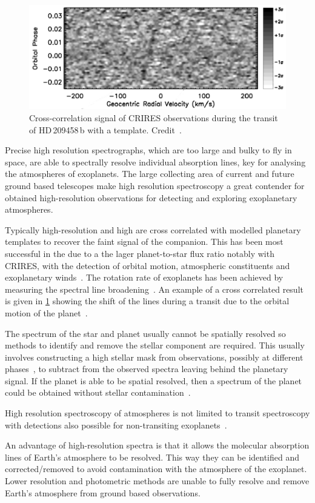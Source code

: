 \begin{figure}
    \centering
    \includegraphics[width=0.7\linewidth]{figures/introduction/snellen2010}
    \caption{Cross-correlation signal of {CRIRES} observations during the transit of HD\,209458\,b with a  template.
Credit~\citet{snellen_orbital_2010}.}
    \label{fig:snellen2010}
\end{figure}

Precise high resolution spectrographs, which are too large and bulky to fly in space, are able to spectrally resolve individual absorption lines, key for analysing the atmospheres of exoplanets.
The large collecting area of current and future ground based telescopes make high resolution spectroscopy a great contender for obtained high-resolution observations for detecting and exploring exoplanetary atmospheres.

Typically high-resolution and high \snr{} are cross correlated with modelled planetary templates to recover the faint signal of the companion.
This has been most successful in the \nir{} due to a the lager planet-to-star flux ratio
notably with CRIRES, with the detection of orbital motion, atmospheric constituents and exoplanetary winds~\citep[e.g.][]{snellen_orbital_2010, dekok_detection_2013, brogi_carbon_2014, brogi_rotation_2016, schwarz_evidence_2015}.
The rotation rate of exoplanets has been achieved by measuring the spectral line broadening~\citep{snellen_fast_2014, brogi_rotation_2016}.
An example of a cross correlated result is given in \cref{fig:snellen2010} showing the shift of the  lines during a transit due to the orbital motion of the planet~\citep{snellen_orbital_2010}.

The spectrum of the star and planet usually cannot be spatially resolved so methods to identify and remove the stellar component are required.
This usually involves constructing a high \snr{} stellar mask from observations, possibly at different phases~\citep[e.g.][]{rodler_weighing_2012}, to subtract from the observed spectra leaving behind the planetary signal.
If the planet is able to be spatial resolved, then a spectrum of the planet could be obtained without stellar contamination~\citep[e.g.][]{snellen_combining_2015}.

High resolution spectroscopy of atmospheres is not limited to transit spectroscopy with detections also possible for non-transiting exoplanets~\citep[e.g.][]{brogi_signature_2012, brogi_carbon_2014,lockwood_nearir_2014, piskorz_evidence_2016}.

An advantage of high-resolution spectra is that it allows the molecular absorption lines of Earth's atmosphere to be resolved.
This way they can be identified and corrected/removed to avoid contamination with the atmosphere of the exoplanet.
 Lower resolution and photometric methods are unable to fully resolve and remove Earth's atmosphere from ground based observations.
